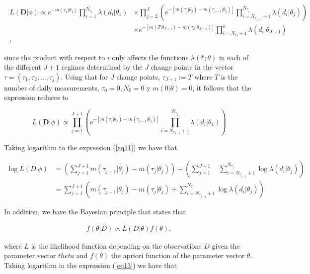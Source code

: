 \documentclass[APA,STIX1COL]{WileyNJD-v2}
\begin{document}
\begin{align} \label{eq10}
\begin{split}
L(\mathbf{D}|\phi) \propto e^{-m(\tau_1|\theta_1)} \prod_{i=1}^{N_{\tau_1}} \lambda(d_i|\theta_1) & \times \prod_{j=2}^{J} \left( e^{-[m(\tau_j|\theta_j)-m(\tau_{j-1} | \theta_j )]} \prod_{i=N_{\tau_{j-1}}+1}^{N_{\tau_j}} \lambda(d_i |\theta_j) \right) \\
& \times e^{-[m(T |\theta_{J+1})-m(\tau_{J}|\theta_{J+1} )]} \prod_{i=N_{\tau_{J}}+1}^{n}\lambda(d_i|\theta_{J+1}) \\,
\end{split}
\end{align}

since the product with respect to $i$ only affects the functions $\lambda(*;\theta)$ in each of the different $J+1$ regimes determined by the $J$ change points in the vector $\tau =(\tau_1, \tau_2,\dots, \tau_j)$.
Using that for $J$ change points, $\tau_{J+1} := T$ where $T$ is the number of daily measurements, $\tau_0=0,N_0=0$ y $m(0|\theta)=0$, it follows that the expression reduces to

\begin{equation}
\label{eq11}
L(\mathbf{D}|\phi) \propto  \prod_{j=1}^{J+1} \left( e^{-[m(\tau_j|\theta_j)-m(\tau_{j-1} | \theta_j )]} \prod_{i=N_{\tau_{J-1}}+1}^{N_{\tau_j}} \lambda(d_i|\theta_1)   \right)  
\end{equation}


Taking logarithm to the expression (\ref{eq11}) we have that

\begin{align}%
	\label{eq12}
	\log L(D|\phi) &= \left( \sum_{j=1}^{J+1}   m(\tau_{j-1}|\theta_j)-m(\tau_j|\theta_j)   \right) +\left(\sum_{j=1}^{J+1} \quad \sum_{i= N_{\tau_{j-1}}+1}^{ N_{\tau_j}} \log\lambda(d_i|\theta_j) \right)\nonumber\\
	&=\sum_{j=1}^{J+1} \left(  m(\tau_{j-1}|\theta_j)-m(\tau_j|\theta_j)+\sum_{i= N_{\tau_{j-1}}+1}^{ N_{\tau_j}} \log\lambda(d_i|\theta_j)   \right)
\end{align}

In addition, we have the Bayesian principle that states that 

\begin{align}%
	\label{eq13}
f(\theta|D)\propto L(D|\theta) f(\theta), 
\end{align}

where $L$ is the likelihood function depending on the observations $D$ given the parameter vector $theta$ and $f(\theta)$ the apriori function of the parameter vector $\theta$. Taking logarithm in the expression (\ref{eq13}) we have that
\end{document}
